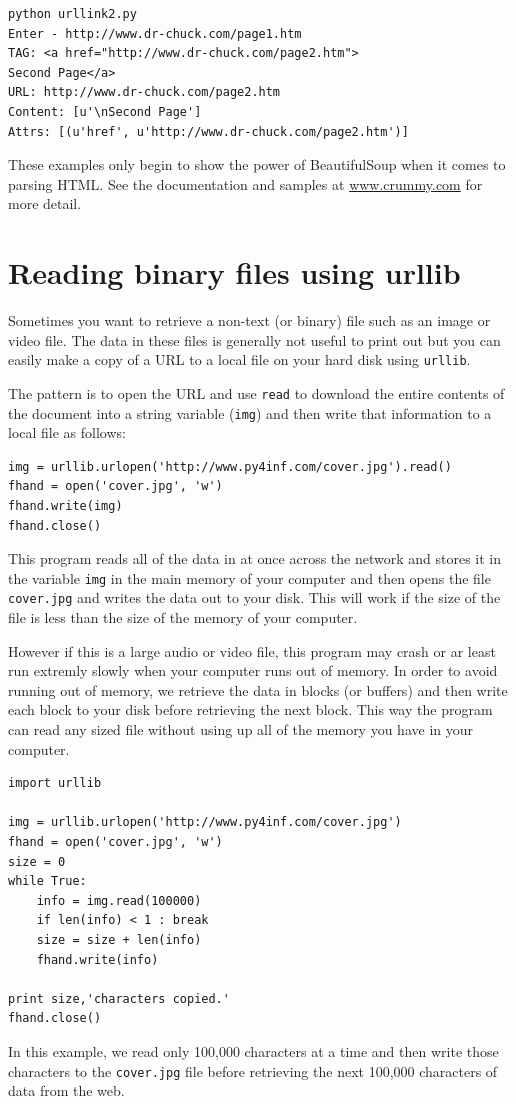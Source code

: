 \documentclass[10pt]{book}
\begin{document}
\beforeverb
\begin{verbatim}
python urllink2.py 
Enter - http://www.dr-chuck.com/page1.htm
TAG: <a href="http://www.dr-chuck.com/page2.htm">
Second Page</a>
URL: http://www.dr-chuck.com/page2.htm
Content: [u'\nSecond Page']
Attrs: [(u'href', u'http://www.dr-chuck.com/page2.htm')]
\end{verbatim}
\afterverb
%
These examples only begin to show the power of BeautifulSoup
when it comes to parsing HTML.  See the documentation 
and samples at
\url{www.crummy.com}
for more detail.

\section{Reading binary files using urllib}

Sometimes you want to retrieve a non-text (or binary) file such as
an image or video file. The data in these files is generally not 
useful to print out but you can easily make a copy of a URL to a local
file on your hard disk using {\tt urllib}.

The pattern is to open the URL and use {\tt read} to download the entire
contents of the document into a string variable ({\tt img}) and then write that
information to a local file as follows:

\beforeverb
\begin{verbatim}
img = urllib.urlopen('http://www.py4inf.com/cover.jpg').read()
fhand = open('cover.jpg', 'w')
fhand.write(img)
fhand.close()
\end{verbatim}
\afterverb
%
This program reads all of the data in at once across the network and 
stores it in the variable {\tt img} in the main memory of your computer
and then opens the file {\tt cover.jpg} and writes the data out to your 
disk.  This will work if the size of the file is less than the size
of the memory of your computer.

However if this is a large audio or video file, this program may crash
or ar least run extremly slowly when your computer runs out of memory.
In order to avoid running out of memory, we retrieve the data in blocks
(or buffers) and then write each block to your disk before retrieving
the next block.  This way the program can read any sized file without
using up all of the memory you have in your computer.

\beforeverb
\begin{verbatim}
import urllib

img = urllib.urlopen('http://www.py4inf.com/cover.jpg')
fhand = open('cover.jpg', 'w')
size = 0
while True:
    info = img.read(100000)
    if len(info) < 1 : break
    size = size + len(info)
    fhand.write(info)

print size,'characters copied.'
fhand.close()
\end{verbatim}
\afterverb
%
In this example, we read only 100,000 characters at a time and then 
write those characters to the {\tt cover.jpg} file
before retrieving the next 100,000 characters of data from the
web.
\end{document}
